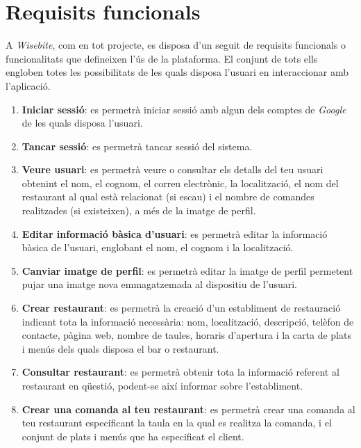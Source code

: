 
\section{Requisits funcionals}

A \textit{Wisebite}, com en tot projecte, es disposa d'un seguit de requisits funcionals o funcionalitats que defineixen l'ús de la plataforma. El conjunt de tots ells engloben totes les possibilitats de les quals disposa l'usuari en interaccionar amb l'aplicació.

\begin{enumerate}
\item \textbf{Iniciar sessió}: es permetrà iniciar sessió amb algun dels comptes de \textit{Google} de les quals disposa l'usuari.
\item \textbf{Tancar sessió}: es permetrà tancar sessió del sistema.
\item \textbf{Veure usuari}: es permetrà veure o consultar els detalls del teu usuari obtenint el nom, el cognom, el correu electrònic, la localització, el nom del restaurant al qual està relacionat (si escau) i el nombre de comandes realitzades (si existeixen), a més de la imatge de perfil.
\item \textbf{Editar informació bàsica d'usuari}: es permetrà editar la informació bàsica de l'usuari, englobant el nom, el cognom i la localització.
\item \textbf{Canviar imatge de perfil}: es permetrà editar la imatge de perfil permetent pujar una imatge nova emmagatzemada al dispositiu de l'usuari.
\item \textbf{Crear restaurant}: es permetrà la creació d'un establiment de restauració indicant tota la informació necessària: nom, localització, descripció, telèfon de contacte, pàgina web, nombre de taules, horaris d'apertura i la carta de plats i menús dels quals disposa el bar o restaurant.
\item \textbf{Consultar restaurant}: es permetrà obtenir tota la informació referent al restaurant en qüestió, podent-se així informar sobre l'establiment.
\item \textbf{Crear una comanda al teu restaurant}: es permetrà crear una comanda al teu restaurant especificant la taula en la qual es realitza la comanda, i el conjunt de plats i menús que ha especificat el client.

\end{enumerate}

